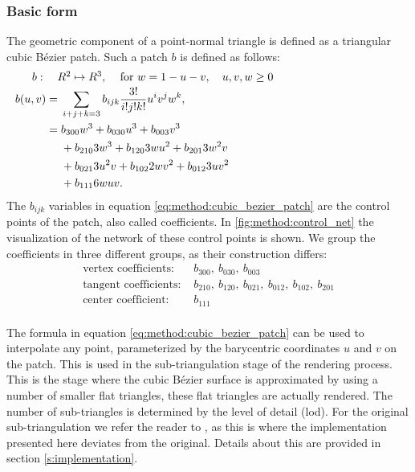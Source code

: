 \subsubsection{Basic form}
The geometric component of a point-normal triangle is defined as a triangular cubic Bézier patch. Such a patch $b$ is defined as follows:
%
\begin{align}
\noalign{$b: \quad R^2 \mapsto R^3,\quad$ for $w = 1 - u - v, \quad u, v, w \geq 0$}
\begin{split}\label{eq:method:cubic_bezier_patch}
    b(u,v) ={}& \sum_{i + j + k = 3} b_{ijk}\frac{3!}{i!j!k!} u^i v^j w^k,\\
      	   ={}& b_{300}w^3 + b_{030}u^3 + b_{003}v^3\\
      	    {}& + b_{210}3w^3 + b_{120}3wu^2 + b_{201}3w^2v\\
      	    {}& + b_{021}3u^2v + b_{102}2wv^2 + b_{012}3uv^2\\
      	    {}& + b_{111}6wuv.
\end{split}
\end{align}
%
The $b_{ijk}$ variables in equation \ref{eq:method:cubic_bezier_patch} are the control points of the patch, also called coefficients. In \cref{fig:method:control_net} the visualization of the network of these control points is shown. We group the coefficients in three different groups, as their construction differs:
%
\begin{align*}
	\text{vertex coefficients: } {}&  b_{300},\ b_{030},\ b_{003} \\
	\text{tangent coefficients: } {}&  b_{210},\ b_{120},\ b_{021},\ b_{012},\ b_{102},\ b_{201}\\
	\text{center coefficient: }   {}&  b_{111}\\
\end{align*}

The formula in equation \eqref{eq:method:cubic_bezier_patch} can be used to interpolate any point, parameterized by the barycentric coordinates $u$ and $v$ on the patch. This is used in the sub-triangulation stage of the rendering process. This is the stage where the cubic Bézier surface is approximated by using a number of smaller flat triangles, these flat triangles are actually rendered. The number of sub-triangles is determined by the level of detail (lod). For the original sub-triangulation we refer the reader to \textcite{vlachos2001curved}, as this is where the implementation presented here deviates from the original. Details about this are provided in section \ref{s:implementation}.


